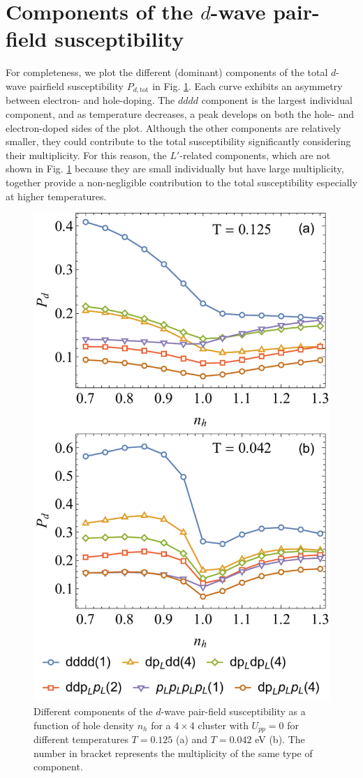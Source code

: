 \documentclass[reprint,nofootinbib,nobibnotes,amsmath,amssymb,aps,prb,floatfix]{revtex4-2}
\newcommand{\figdisp}[1]{Fig. \ref{#1}}
\begin{document}
\appendix

\section{Components of the $d$-wave pair-field susceptibility}\label{sec:appendix}
For completeness, we plot the different (dominant) components of the total $d$-wave pairfield susceptibility $P_{d,\text{tot}}$ in \figdisp{Pdcomponents}. Each curve exhibits an asymmetry between electron- and hole-doping. The $dddd$ component is the largest individual component, and as temperature decreases, a peak develops on both the hole- and electron-doped sides of the plot. Although the other components are relatively smaller, they could contribute to the total susceptibility significantly considering their multiplicity. For this reason, the $L'$-related components, which are not shown in \figdisp{Pdcomponents} because they are small individually but have large multiplicity, together provide a non-negligible contribution to the total susceptibility especially at higher temperatures.

\begin{figure}[ht]
\includegraphics[width=0.8\linewidth]{Pdcomponents.pdf}
\caption{ Different components of the $d$-wave pair-field susceptibility as a function of hole density $n_h$ for a $4\times4$ cluster with $U_{pp}=0$ for different temperatures $T=0.125$ (a) and $T=0.042$ eV (b). The number in bracket represents the multiplicity of the same type of component.
}
\label{Pdcomponents}
\end{figure}
\end{document}
